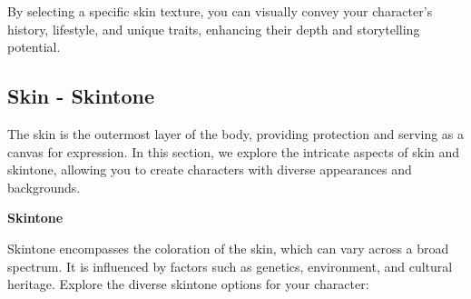 \documentclass[12pt]{book}  %
\begin{document}
By selecting a specific skin texture, you can visually convey your character's history, lifestyle, and unique traits, enhancing their depth and storytelling potential.

\subsection{\textbf{Skin  - Skintone}}

The skin is the outermost layer of the body, providing protection and serving as a canvas for expression. In this section, we explore the intricate aspects of skin and skintone, allowing you to create characters with diverse appearances and backgrounds.

\textbf{Skintone}

Skintone encompasses the coloration of the skin, which can vary across a broad spectrum. It is influenced by factors such as genetics, environment, and cultural heritage. Explore the diverse skintone options for your character:
\end{document}
